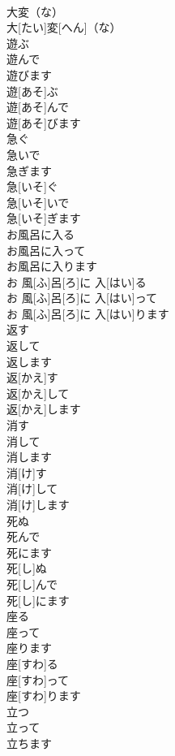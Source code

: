 \documentclass[8pt]{extreport}
\begin{document}
\begin{CJK}{UTF8}{min}
\\	大変（な）	
\\	大[たい]変[へん]（な）	
\\	遊ぶ 
\\	遊んで 
\\	遊びます	
\\	遊[あそ]ぶ 
\\	遊[あそ]んで 
\\	遊[あそ]びます	
\\	急ぐ 
\\	急いで 
\\	急ぎます	
\\	急[いそ]ぐ 
\\	急[いそ]いで 
\\	急[いそ]ぎます	
\\	お風呂に入る 
\\	お風呂に入って 
\\	お風呂に入ります	
\\	お 風[ふ]呂[ろ]に 入[はい]る 
\\	お 風[ふ]呂[ろ]に 入[はい]って 
\\	お 風[ふ]呂[ろ]に 入[はい]ります	
\\	返す 
\\	返して 
\\	返します	
\\	返[かえ]す 
\\	返[かえ]して 
\\	返[かえ]します	
\\	消す 
\\	消して 
\\	消します	
\\	消[け]す 
\\	消[け]して 
\\	消[け]します	
\\	死ぬ 
\\	死んで 
\\	死にます	
\\	死[し]ぬ 
\\	死[し]んで 
\\	死[し]にます	
\\	座る 
\\	座って 
\\	座ります	
\\	座[すわ]る 
\\	座[すわ]って 
\\	座[すわ]ります	
\\	立つ 
\\	立って 
\\	立ちます	

\end{CJK}
\end{document}
